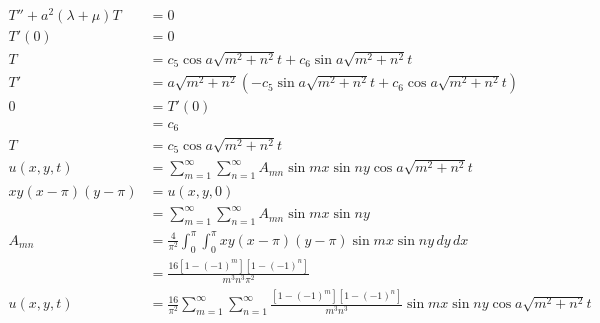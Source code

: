 \documentclass{article}
\begin{document}
\begin{align*}
  T'' + a^2 (\lambda + \mu) T & = 0                                                                                                                                              \\
  T'(0)                       & = 0                                                                                                                                              \\
  T                           & = c_5 \cos a \sqrt{m^2 + n^2} t + c_6 \sin a \sqrt{m^2 + n^2} t                                                                                  \\
  T'                          & = a \sqrt{m^2 + n^2} (-c_5 \sin a \sqrt{m^2 + n^2} t + c_6 \cos a \sqrt{m^2 + n^2} t)                                                            \\
  0                           & = T'(0)                                                                                                                                          \\
                              & = c_6                                                                                                                                            \\
  T                           & = c_5 \cos a \sqrt{m^2 + n^2} t                                                                                                                  \\
  u(x, y, t)                  & = \sum_{m = 1}^\infty \sum_{n = 1}^\infty A_{m n} \sin m x \sin n y \cos a \sqrt{m^2 + n^2} t                                                    \\
  x y (x - \pi) (y - \pi)     & = u(x, y, 0)                                                                                                                                     \\
                              & = \sum_{m = 1}^\infty \sum_{n = 1}^\infty A_{m n} \sin m x \sin n y                                                                              \\
  A_{m n}                     & = \frac{4}{\pi^2} \int_0^\pi \int_0^\pi x y (x - \pi) (y - \pi) \sin m x \sin n y \,d y \,d x                                                    \\
                              & = \frac{16 [1 - (-1)^m] [1 - (-1)^n]}{m^3 n^3 \pi^2}                                                                                             \\
  u(x, y, t)                  & = \frac{16}{\pi^2} \sum_{m = 1}^\infty \sum_{n = 1}^\infty \frac{[1 - (-1)^m] [1 - (-1)^n]}{m^3 n^3} \sin m x \sin n y \cos a \sqrt{m^2 + n^2} t
\end{align*}
\end{document}
